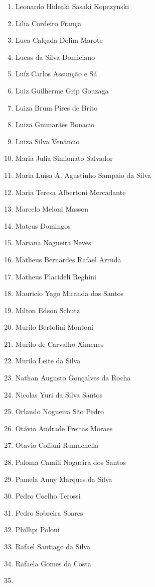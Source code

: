 \documentclass[
  letterpaper,
  DIV=11,
  numbers=noendperiod]{scrreprt}
\begin{document}
\begin{enumerate}
  Leonardo Bonfa Schroeder
\item
  Leonardo Hideaki Sasaki Kopczynski
\item
  Lilia Cordeiro França
\item
  Luca Calçada Dolim Marote
\item
  Lucas da Silva Domiciano
\item
  Luíz Carlos Assunção e Sá
\item
  Luiz Guilherme Grip Gonzaga
\item
  Luiza Brum Pires de Brito
\item
  Luiza Guimarães Bonacio
\item
  Luiza Silva Venâncio
\item
  Maria Julia Simionato Salvador
\item
  Maria Luisa A. Agustinho Sampaio da Silva
\item
  Maria Teresa Albertoni Mercadante
\item
  Marcelo Meloni Masson
\item
  Mateus Domingos
\item
  Mariana Nogueira Neves
\item
  Matheus Bernardes Rafael Arruda
\item
  Matheus Placideli Reghini
\item
  Mauricio Yago Miranda dos Santos
\item
  Milton Edson Schutz
\item
  Murilo Bertolini Montoni
\item
  Murilo de Carvalho Ximenes
\item
  Murilo Leite da Silva
\item
  Nathan Augusto Gonçalves da Rocha
\item
  Nicolas Yuri da Silva Santos
\item
  Orlando Nogueira São Pedro
\item
  Otávio Andrade Freitas Moraes
\item
  Otavio Coffani Rumachella
\item
  Paloma Camili Nogueira dos Santos
\item
  Pamela Anny Marques da Silva
\item
  Pedro Coelho Terossi
\item
  Pedro Sobreira Soares
\item
  Phillipi Poloni
\item
  Rafael Santiago da Silva
\item
  Rafaela Gomes da Costa
\item

\end{enumerate}
\end{document}
